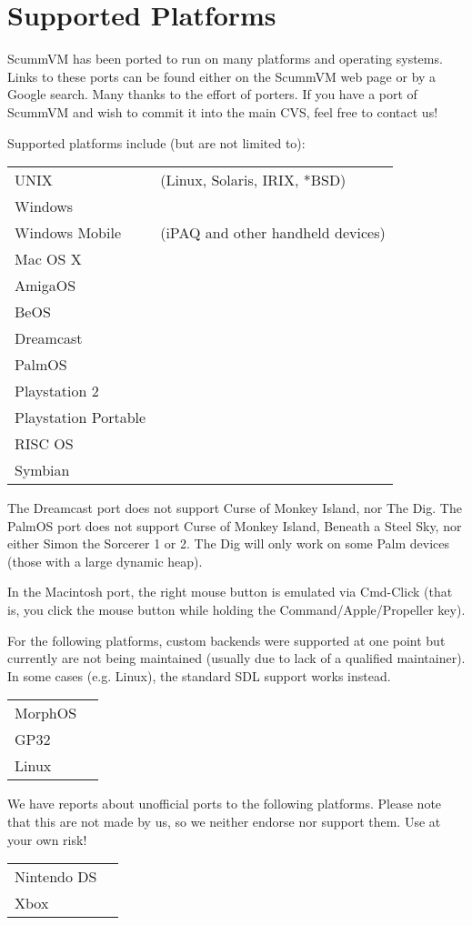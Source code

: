 

\section{Supported Platforms}
ScummVM has been ported to run on many platforms and operating systems.
Links to these ports can be found either on the ScummVM web page or by a
Google search. Many thanks to the effort of porters. If you have a port of
ScummVM and wish to commit it into the main CVS, feel free to contact us!

Supported platforms include (but are not limited to):

\begin{tabular}{ll}
UNIX            &(Linux, Solaris, IRIX, *BSD)\\
Windows         \\
Windows Mobile  &(iPAQ and other handheld devices)\\
Mac OS X        \\
AmigaOS         \\
BeOS            \\
Dreamcast       \\
PalmOS          \\
Playstation 2   \\
Playstation Portable\\
RISC OS         \\
Symbian         \\
\end{tabular}

The Dreamcast port does not support Curse of Monkey Island, nor The Dig.
The PalmOS port does not support Curse of Monkey Island, Beneath a Steel
Sky, nor either Simon the Sorcerer 1 or 2. The Dig will only work on some
Palm devices (those with a large dynamic heap).

In the Macintosh port, the right mouse button is emulated via Cmd-Click (that
is, you click the mouse button while holding the Command/Apple/Propeller key).

For the following platforms, custom backends were supported at one point
but currently are not being maintained (usually due to lack of a qualified
maintainer). In some cases (e.g. Linux), the standard SDL support works
instead.

\begin{tabular}{ll}
MorphOS\\
GP32   \\
Linux  \\
\end{tabular}

We have reports about unofficial ports to the following platforms. Please
note that this are not made by us, so we neither endorse nor support them.
Use at your own risk!

\begin{tabular}{ll}
Nintendo DS\\
Xbox       \\
\end{tabular}
